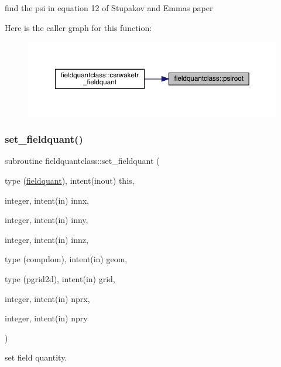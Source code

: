 find the psi in equation 12 of Stupakov and Emma\textquotesingle{}s paper 

Here is the caller graph for this function\+:\nopagebreak
\begin{figure}[H]
\begin{center}
\leavevmode
\includegraphics[width=350pt]{namespacefieldquantclass_ae02f70d677d4bedfa6e41bd6cf33d612_icgraph}
\end{center}
\end{figure}
\mbox{\label{namespacefieldquantclass_a2d6cd3fb8b4d962adbd4206a5fbd13ce}} 
\subsubsection{\texorpdfstring{set\_fieldquant()}{set\_fieldquant()}}
{\footnotesize\ttfamily subroutine fieldquantclass\+::set\+\_\+fieldquant (\begin{DoxyParamCaption}\item[{type (\mbox{\hyperlink{namespacefieldquantclass_structfieldquantclass_1_1fieldquant}{fieldquant}}), intent(inout)}]{this,  }\item[{integer, intent(in)}]{innx,  }\item[{integer, intent(in)}]{inny,  }\item[{integer, intent(in)}]{innz,  }\item[{type (compdom), intent(in)}]{geom,  }\item[{type (pgrid2d), intent(in)}]{grid,  }\item[{integer, intent(in)}]{nprx,  }\item[{integer, intent(in)}]{npry }\end{DoxyParamCaption})}



set field quantity. 

